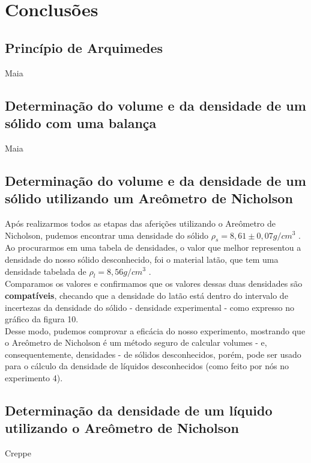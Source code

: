 \newpage
\section{Conclusões}


\subsection{Princípio de Arquimedes}

Maia


\subsection{Determinação do volume e da densidade de um sólido com
uma balança}

Maia


\subsection{Determinação do volume e da densidade de um sólido
utilizando um Areômetro de Nicholson}

Após realizarmos todos as etapas das aferições utilizando o Areômetro de Nicholson, pudemos encontrar uma densidade do sólido $\rho _s = 8,61 \pm 0,07 g/cm^3$ . Ao procurarmos em uma tabela de densidades, o valor que melhor representou a densidade do nosso sólido desconhecido, foi o material latão, que tem uma densidade tabelada de $\rho_l = 8,56 g/cm^3$ . \\

Comparamos os valores e confirmamos que os valores dessas duas densidades são \textbf{compatíveis}, checando que a densidade do latão está dentro do intervalo de incertezas da densidade do sólido - densidade experimental - como expresso no gráfico da figura 10.\\

Desse modo, pudemos comprovar a eficácia do nosso experimento, mostrando que o Areômetro de Nicholson é um método seguro de calcular volumes - e, consequentemente, densidades - de sólidos desconhecidos, porém, pode ser usado para o cálculo da densidade de líquidos desconhecidos (como feito por nós no experimento 4).\\


\subsection{Determinação da densidade de um líquido utilizando o
Areômetro de Nicholson}

Creppe

